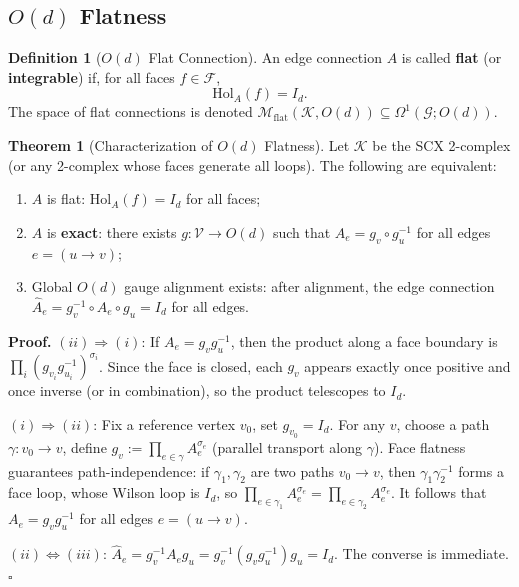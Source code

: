 \documentclass[12pt,a4paper]{article}
\theoremstyle{definition}
\newtheorem{definition}{Definition}[section]
\newtheorem{theorem}{Theorem}[section]
\theoremstyle{remark}
\theoremstyle{definition}
\newcommand{\Od}{O(d)}
\newcommand{\grph}{\mathcal{G}}
\newcommand{\verts}{\mathcal{V}}
\newcommand{\faces}{\mathcal{F}}
\newcommand{\face}{\ensuremath{\mathit{f}}}
\newcommand{\Hol}{\mathrm{Hol}}
\newcommand{\Gflat}{\mathcal{M}_{\mathrm{flat}}}
\begin{document}
\subsection{$O(d)$ Flatness}

\begin{definition}[$O(d)$ Flat Connection]\label{def:od_flat}
An edge connection $A$ is called \textbf{flat} (or \textbf{integrable}) if, for all faces $\face \in \faces$,
\[
    \Hol_A(\face) = I_d.
\]
The space of flat connections is denoted $\Gflat(\mathcal{K}, \Od) \subseteq \Omega^1(\grph; \Od)$.
\end{definition}

\begin{theorem}[Characterization of $O(d)$ Flatness]\label{thm:od_flat_char}
Let $\mathcal{K}$ be the SCX 2-complex (or any 2-complex whose faces generate all loops).
The following are equivalent:

\begin{enumerate}[label=(\roman*)]
    \item $A$ is flat: $\Hol_A(\face) = I_d$ for all faces;
    \item $A$ is \textbf{exact}: there exists $g: \verts \to \Od$ such that $A_e = g_v \circ g_u^{-1}$ for all edges $e = (u \to v)$;
    \item Global $O(d)$ gauge alignment exists: after alignment, the edge connection $\hat{A}_e = g_v^{-1} \circ A_e \circ g_u = I_d$ for all edges.
\end{enumerate}

\textbf{Proof.}
$(ii) \Rightarrow (i)$: If $A_e = g_v g_u^{-1}$, then the product along a face boundary is $\prod_i (g_{v_i} g_{u_i}^{-1})^{\sigma_i}$.
Since the face is closed, each $g_v$ appears exactly once positive and once inverse (or in combination), so the product telescopes to $I_d$.

$(i) \Rightarrow (ii)$: Fix a reference vertex $v_0$, set $g_{v_0} = I_d$.
For any $v$, choose a path $\gamma: v_0 \to v$, define
$g_v := \prod_{e \in \gamma} A_e^{\sigma_e}$ (parallel transport along $\gamma$).
Face flatness guarantees path-independence:
if $\gamma_1, \gamma_2$ are two paths $v_0 \to v$, then $\gamma_1 \gamma_2^{-1}$ forms a face loop,
whose Wilson loop is $I_d$, so $\prod_{e \in \gamma_1} A_e^{\sigma_e} = \prod_{e \in \gamma_2} A_e^{\sigma_e}$.
It follows that $A_e = g_v g_u^{-1}$ for all edges $e = (u \to v)$.

$(ii) \Leftrightarrow (iii)$: $\hat{A}_e = g_v^{-1} A_e g_u = g_v^{-1} (g_v g_u^{-1}) g_u = I_d$. The converse is immediate. $\square$
\end{theorem}
\end{document}

